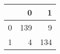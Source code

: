 \begin{tabular}{lrr}
\toprule
{} &    0 &    1 \\
\midrule
0 &  139 &    9 \\
1 &    4 &  134 \\
\bottomrule
\end{tabular}
